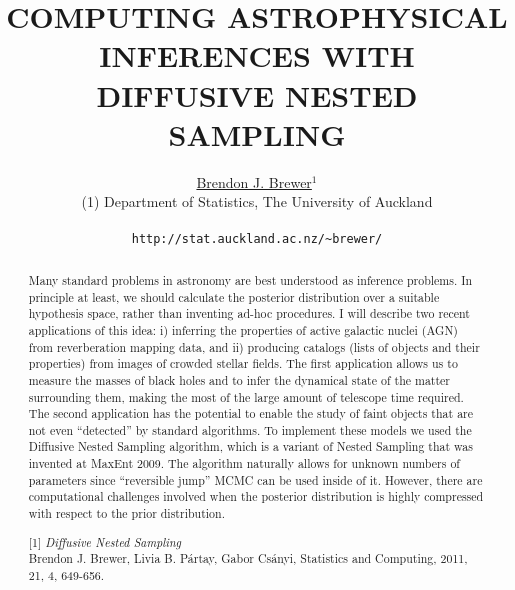 \documentclass[letterpaper,12pt]{article}
\begin{document}
\title{COMPUTING ASTROPHYSICAL INFERENCES WITH DIFFUSIVE NESTED SAMPLING}

\author{\underline{Brendon J. Brewer}$^{1}$\\
        (1) Department of Statistics, The University of Auckland\\
	\\
        {\tt http://stat.auckland.ac.nz/\~{ }brewer/}
       }

\date{}
\maketitle

\begin{abstract}
\noindent

Many standard problems in astronomy are best understood as inference problems.
In principle at least,
we should calculate the posterior distribution over a suitable hypothesis space,
rather than inventing ad-hoc procedures. I will describe two recent applications
of this idea: i) inferring the properties of active galactic nuclei (AGN)
from reverberation mapping data, and ii) producing catalogs (lists of objects
and their properties) from images of
crowded stellar fields. The first application allows us to measure the masses
of black holes and to infer the dynamical state of the matter surrounding them,
making the most of the large amount of telescope time required. The second
application has the potential to enable the study of faint objects that are not
even ``detected'' by standard algorithms.
To implement these models we used the Diffusive Nested Sampling algorithm,
which is a variant of Nested Sampling that was invented at MaxEnt 2009. The
algorithm naturally allows for unknown numbers of parameters since
``reversible jump'' MCMC can be used inside of it. However, there are
computational challenges involved when the posterior distribution is highly
compressed with respect to the prior distribution.


\vspace{1cm}
\medskip{}

[1] {\it Diffusive Nested Sampling}\\
Brendon J. Brewer, Livia B. P{\'a}rtay, Gabor Cs{\'a}nyi,
Statistics and Computing, 2011, 21, 4, 649-656.\\


\end{abstract}
\end{document}
